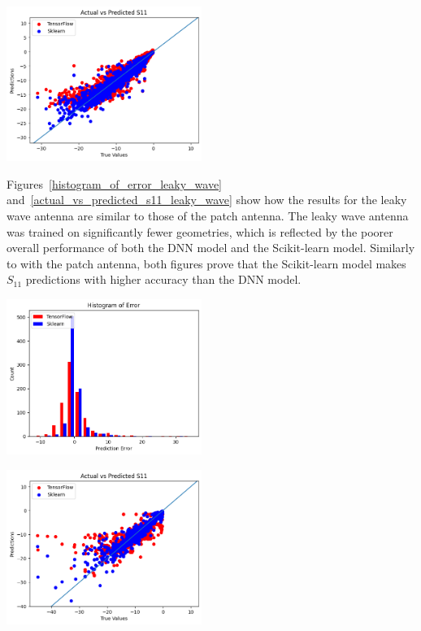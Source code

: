 \documentclass[lettersize,journal]{IEEEtran}
\newenvironment{Figure}
    {\par\medskip\noindent\minipage{\linewidth}}
    {\endminipage\par\medskip}
\begin{document}
\begin{Figure}
    \centering
    \includegraphics[width=2.5in]{actual_vs_predicted_s11_patch}
    \label{actual_vs_predicted_s11_patch}
\end{Figure}

Figures~\ref{histogram_of_error_leaky_wave} and~\ref{actual_vs_predicted_s11_leaky_wave} show how the results for the leaky wave antenna are similar to those of the patch antenna. The leaky wave antenna was trained on significantly fewer geometries, which is reflected by the poorer overall performance of both the DNN model and the Scikit-learn model. Similarly to with the patch antenna, both figures prove that the Scikit-learn model makes $S_{11}$ predictions with higher accuracy than the DNN model.

\begin{Figure}
    \centering
    \includegraphics[width=2.5in]{histogram_leaky_wave}
    \label{histogram_of_error_leaky_wave}
\end{Figure}

\begin{Figure}
    \centering
    \includegraphics[width=2.5in]{actual_vs_predicted_s11_leaky_wave}
    \label{actual_vs_predicted_s11_leaky_wave}
\end{Figure}
\end{document}
